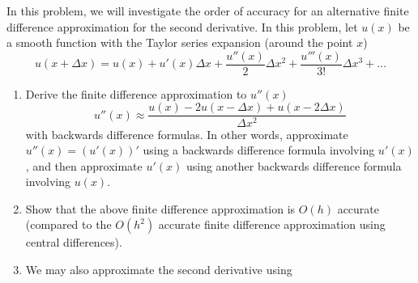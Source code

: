 
In this problem, we will investigate the order of accuracy for an alternative finite difference approximation for the second derivative.  In this problem, let $u(x)$ be a smooth function with the Taylor series expansion (around the point $x$)
\[
u(x+\Delta x) = u(x) + u'(x)\Delta x + \frac{u''(x)}{2}\Delta x^2 + \frac{u'''(x)}{3!}\Delta x^3 + \ldots 
\]
\begin{enumerate}
\item Derive the finite difference approximation to $u''(x)$
\[
u''(x) \approx \frac{u(x)-2u(x-\Delta x) + u(x-2\Delta x)}{\Delta x^2}
\]
with backwards difference formulas.  In other words, approximate $u''(x) = (u'(x))'$ using a backwards difference formula involving $u'(x)$, and then approximate $u'(x)$ using another backwards difference formula involving $u(x)$. 
\item Show that the above finite difference approximation is $O(h)$ accurate (compared to the $O(h^2)$ accurate finite difference approximation using central differences).
\item We may also approximate the second derivative using 

\end{enumerate}